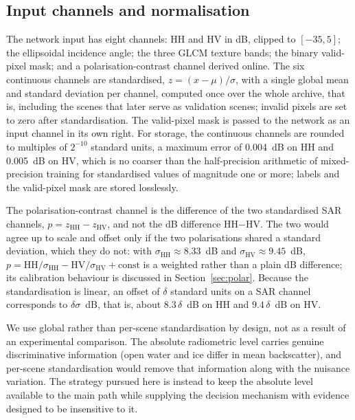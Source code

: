 \documentclass[preprint,12pt,authoryear]{elsarticle}
\begin{document}
\subsection{Input channels and normalisation}
\label{sec:channels}

The network input has eight channels: HH and HV in dB, clipped to
$[-35, 5]$; the ellipsoidal incidence angle; the three GLCM texture bands; the
binary valid-pixel mask; and a polarisation-contrast channel derived online.
The six continuous channels are standardised, $z = (x-\mu)/\sigma$, with a
single global mean and standard deviation per channel, computed once over the
whole archive, that is, including the scenes that later serve as validation
scenes; invalid pixels are set to zero after standardisation. The valid-pixel
mask is passed to the network as an input channel in its own right. For storage, the continuous channels are rounded to multiples of
$2^{-10}$ standard units, a maximum error of 0.004~dB on HH and 0.005~dB on HV,
which is no coarser than the half-precision arithmetic of mixed-precision
training for standardised values of magnitude one or more; labels and the
valid-pixel mask are stored losslessly.

The polarisation-contrast channel is the difference of the two standardised SAR
channels, $p = z_{\mathrm{HH}} - z_{\mathrm{HV}}$, and not the dB difference
HH$-$HV. The two would agree up to scale and offset only if the two
polarisations shared a standard deviation, which they do not: with
$\sigma_{\mathrm{HH}} \approx 8.33$~dB and
$\sigma_{\mathrm{HV}} \approx 9.45$~dB,
$p = \mathrm{HH}/\sigma_{\mathrm{HH}} - \mathrm{HV}/\sigma_{\mathrm{HV}}
+ \mathrm{const}$ is a weighted rather than a plain dB difference; its
calibration behaviour is discussed in Section~\ref{sec:polar}. Because the
standardisation is linear, an offset of $\delta$ standard units on a SAR
channel corresponds to $\delta\sigma$~dB, that is, about $8.3\,\delta$~dB on
HH and $9.4\,\delta$~dB on HV.

We use global rather than per-scene standardisation by design, not as a result
of an experimental comparison. The absolute radiometric level carries genuine
discriminative information (open water and ice differ in mean backscatter),
and per-scene standardisation would remove that information along with the
nuisance variation. The strategy pursued here is instead to keep the absolute
level available to the main path while supplying the decision mechanism with
evidence designed to be insensitive to it.
\end{document}
